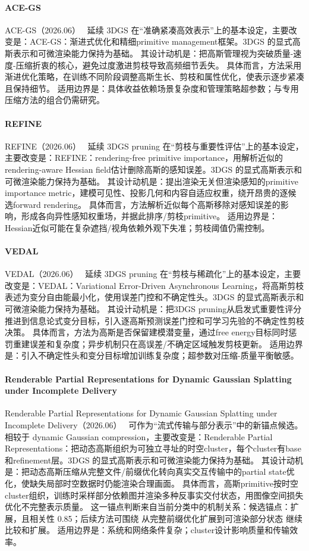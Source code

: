 \paragraph{ACE-GS}
ACE-GS（2026.06）~\cite{2606_21244} 延续 3DGS 在“准确紧凑高效表示”上的基本设定，主要改变是：ACE-GS：渐进式优化和精细primitive management框架。3DGS 的显式高斯表示和可微渲染能力保持为基础。
其设计动机是：把高斯管理视为突破质量-速度-压缩折衷的核心，避免过度激进剪枝导致高频细节丢失。
具体而言，方法采用渐进优化策略，在训练不同阶段调整高斯生长、剪枝和属性优化，使表示逐步紧凑且保持细节。
适用边界是：具体收益依赖场景复杂度和管理策略超参数；与专用压缩方法的组合仍需研究。

\paragraph{REFINE}
REFINE（2026.06）~\cite{2606_09074} 延续 3DGS pruning 在“剪枝与重要性评估”上的基本设定，主要改变是：REFINE：rendering-free primitive importance，用解析近似的rendering-aware Hessian field估计删除高斯的感知误差。3DGS 的显式高斯表示和可微渲染能力保持为基础。
其设计动机是：提出渲染无关但渲染感知的primitive importance metric，建模可见性、投影几何和内容自适应权重，绕开昂贵的逐候选forward rendering。
具体而言，方法解析近似每个高斯移除对感知误差的影响，形成各向异性感知权重场，并据此排序/剪枝primitive。
适用边界是：Hessian近似可能在复杂遮挡/视角依赖外观下失准；剪枝阈值仍需控制。

\paragraph{VEDAL}
VEDAL（2026.06）~\cite{2606_02346} 延续 3DGS pruning 在“剪枝与稀疏化”上的基本设定，主要改变是：VEDAL：Variational Error-Driven Asynchronous Learning，将高斯剪枝表述为变分自由能最小化，使用误差门控和不确定性头。3DGS 的显式高斯表示和可微渲染能力保持为基础。
其设计动机是：把3DGS pruning从启发式重要性评分推进到信息论式变分目标，引入逐高斯预测误差门控和可学习先验的不确定性剪枝决策。
具体而言，方法为高斯是否保留建模潜变量，通过free energy目标同时惩罚重建误差和复杂度；异步机制只在高误差/不确定区域触发剪枝更新。
适用边界是：引入不确定性头和变分目标增加训练复杂度；超参数对压缩-质量平衡敏感。

\paragraph{Renderable Partial Representations for Dynamic Gaussian Splatting under Incomplete Delivery}
Renderable Partial Representations for Dynamic Gaussian Splatting under Incomplete Delivery（2026.06）~\cite{2606_17212} 可作为“流式传输与部分表示”中的新锚点候选。相较于 dynamic Gaussian compression，主要改变是：Renderable Partial Representations：把动态高斯组织为可独立寻址的时空cluster，每个cluster有base和refinement层。3DGS 的显式高斯表示和可微渲染能力保持为基础。
其设计动机是：把动态高斯压缩从完整文件/前缀优化转向真实交互传输中的partial state优化，使缺失局部时空数据时仍能渲染合理画面。
具体而言，高斯primitive按时空cluster组织，训练时采样部分依赖图并渲染多种反事实交付状态，用图像空间损失优化不完整表示质量。
这一锚点判断来自当前分类中的机制关系：候选锚点：扩展，且相关性 0.85；后续方法可围绕 从完整前缀优化扩展到可渲染部分状态 继续比较和扩展。
适用边界是：系统和网络条件复杂；cluster设计影响质量和传输效率。
